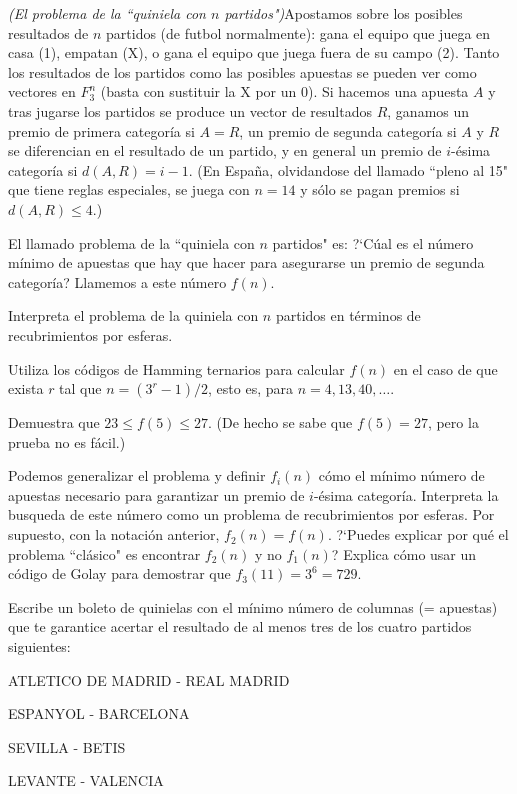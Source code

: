 \begin{problem}[14]
{\it (El problema de la ``quiniela con $n$
partidos")}Apostamos sobre los posibles resultados de $n$ partidos
(de futbol normalmente): gana el equipo que juega en casa (1),
empatan (X), o gana el equipo que juega fuera de su campo (2).
Tanto los resultados de los partidos como las posibles apuestas se
pueden ver como vectores en $ F_3^{n}$ (basta con sustituir la X
por un $0$). Si hacemos una apuesta $A$ y tras jugarse los
partidos se produce un vector de resultados $R$, ganamos un premio
de primera categoría si $A=R$, un premio de segunda categoría si
$A$ y $R$ se diferencian en el resultado de un partido, y en
general un premio de $i$-ésima categoría si $d(A,R)=i-1$. (En
España, olvidandose del llamado ``pleno al 15" que tiene reglas
especiales, se juega con $n=14$ y sólo se pagan premios si
$d(A,R)\le 4$.)

El llamado problema de la ``quiniela con $n$ partidos" es: ?`Cúal
es el número mínimo de apuestas que hay que hacer para asegurarse
un premio de segunda categoría? Llamemos a este número $f(n)$.

\ppart  Interpreta el problema de la quiniela con $n$ partidos en
términos de recubrimientos por esferas.

\ppart Utiliza los códigos de Hamming ternarios para calcular $f(n)$
en el caso de que exista $r$ tal que $n=(3^r-1)/2$, esto es, para
$n=4,13,40,\dots$.

\ppart Demuestra que $23\le f(5)\le 27$. (De hecho se sabe que
$f(5)=27$, pero la prueba no es fácil.)

\ppart Podemos generalizar el problema y definir $f_i(n)$ cómo el
mínimo número de apuestas necesario para garantizar un premio de
$i$-ésima categoría. Interpreta la busqueda de este número como un
problema de recubrimientos por esferas. Por supuesto, con la
notación anterior, $f_2(n)=f(n)$. ?`Puedes explicar por qué el
problema ``clásico" es encontrar $f_2(n)$ y no $f_1(n)$? Explica
cómo usar un código de Golay para demostrar que $f_3
(11)=3^6=729$.

\ppart Escribe un boleto de quinielas con el mínimo número de columnas
(= apuestas) que te garantice acertar el resultado de al menos
tres de los cuatro partidos siguientes:

ATLETICO DE MADRID - REAL MADRID

ESPANYOL - BARCELONA

SEVILLA - BETIS

LEVANTE - VALENCIA


\solution
\end{problem}


